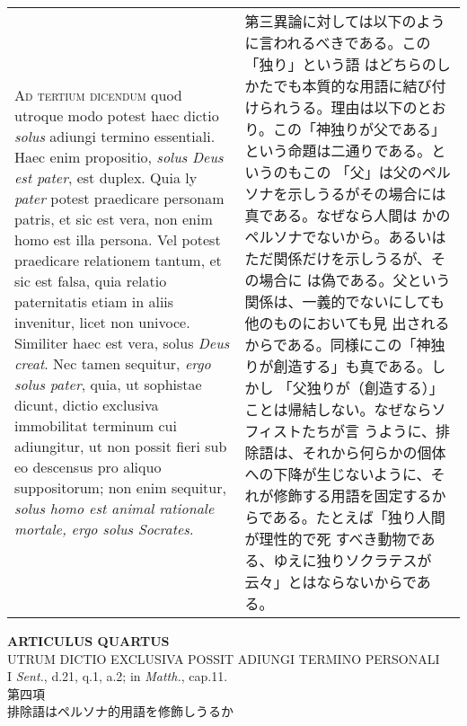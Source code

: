 \documentclass[10pt]{jsarticle} %
\begin{document}
\begin{longtable}{p{21em}p{21em}}
\\




{\scshape Ad tertium dicendum} quod utroque modo potest haec dictio {\itshape solus} adiungi
 termino essentiali. Haec enim propositio, {\itshape solus Deus est pater}, est
 duplex. Quia ly {\itshape pater} potest praedicare personam patris, et sic est
 vera, non enim homo est illa persona. Vel potest praedicare
 relationem tantum, et sic est falsa, quia relatio paternitatis etiam
 in aliis invenitur, licet non univoce. Similiter haec est vera, solus
 {\itshape Deus creat}. Nec tamen sequitur, {\itshape ergo solus pater}, quia, ut sophistae
 dicunt, dictio exclusiva immobilitat terminum cui adiungitur, ut non
 possit fieri sub eo descensus pro aliquo suppositorum; non enim
 sequitur, {\itshape solus homo est animal rationale mortale, ergo solus
 Socrates}.

&

第三異論に対しては以下のように言われるべきである。この「独り」という語
 はどちらのしかたでも本質的な用語に結び付けられうる。理由は以下のとお
 り。この「神独りが父である」という命題は二通りである。というのもこの
 「父」は父のペルソナを示しうるがその場合には真である。なぜなら人間は
 かのペルソナでないから。あるいはただ関係だけを示しうるが、その場合に
 は偽である。父という関係は、一義的でないにしても他のものにおいても見
 出されるからである。同様にこの「神独りが創造する」も真である。しかし
 「父独りが（創造する）」ことは帰結しない。なぜならソフィストたちが言
 うように、排除語は、それから何らかの個体への下降が生じないように、そ
 れが修飾する用語を固定するからである。たとえば「独り人間が理性的で死
 すべき動物である、ゆえに独りソクラテスが云々」とはならないからである。





\end{longtable}
\newpage



\begin{center}
{\Large {\bf ARTICULUS QUARTUS}}\\
{\large UTRUM DICTIO EXCLUSIVA POSSIT ADIUNGI TERMINO PERSONALI}\\
{\footnotesize I {\itshape Sent.}, d.21, q.1, a.2; in {\itshape
 Matth.}, cap.11.}\\
{\Large 第四項\\排除語はペルソナ的用語を修飾しうるか}
\end{center}
\end{document}
